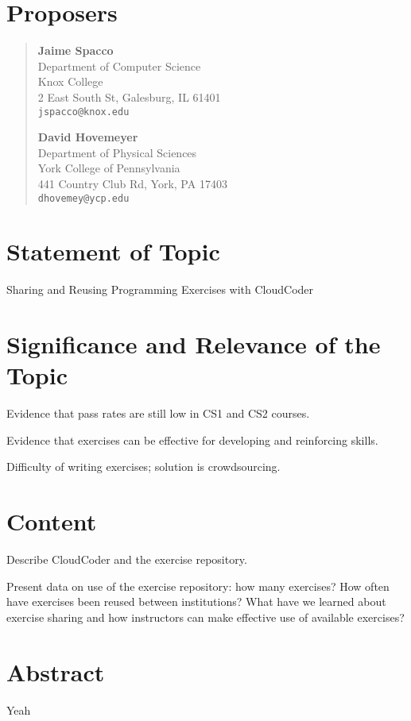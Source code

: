 \documentclass[11pt]{article}
\begin{document}
\section*{Proposers}

\begin{quote}
\begin{minipage}{2.75in}
{\large\bf Jaime Spacco}\\
Department of Computer Science\\
Knox College\\
2 East South St, Galesburg, IL 61401\\
{\tt jspacco@knox.edu}
\end{minipage}
\begin{minipage}{2.75in}
{\large\bf David Hovemeyer}\\
Department of Physical Sciences\\
York College of Pennsylvania\\
441 Country Club Rd, York, PA 17403\\
{\tt dhovemey@ycp.edu}
\end{minipage}
\end{quote}

\section*{Statement of Topic}

{\large Sharing and Reusing Programming Exercises with CloudCoder}

\section*{Significance and Relevance of the Topic}

Evidence that pass rates are still low in CS1 and CS2 courses.

Evidence that exercises can be effective for developing and reinforcing skills.

Difficulty of writing exercises; solution is crowdsourcing.

\section*{Content}

Describe CloudCoder and the exercise repository.

Present data on use of the exercise repository: how many exercises? How often have exercises
been reused between institutions?  What have we learned about exercise sharing and how
instructors can make effective use of available exercises?

\section*{Abstract}

Yeah
\end{document}
